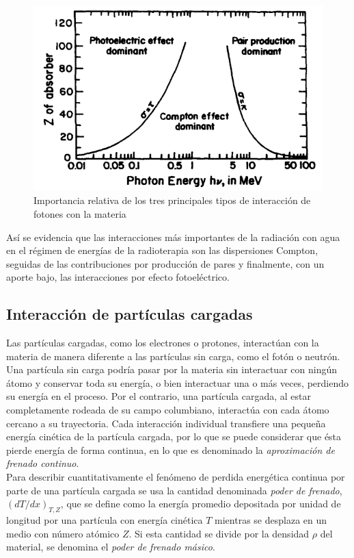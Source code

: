 \begin{figure}[H]
	\centering
	\includegraphics[width=0.7\linewidth]{images/importanciaRelativa.png}
	\caption{Importancia relativa de los tres principales tipos de interacción de fotones con la materia \cite{Attix1986}}
	\label{fig:importanciaRelativa}
\end{figure}

Así se evidencia que las interacciones más importantes de la radiación con agua en el régimen de energías de la radioterapia son las dispersiones Compton, seguidas de las contribuciones por producción de pares y finalmente, con un aporte bajo, las interacciones por efecto fotoeléctrico.  \\

\subsection{Interacción de partículas cargadas}

Las partículas cargadas, como los electrones o protones, interactúan con la materia de manera diferente a las partículas sin carga, como el fotón o neutrón. Una partícula sin carga podría pasar por la materia sin interactuar con ningún átomo y conservar toda su energía, o bien interactuar una o más veces, perdiendo su energía en el proceso. Por el contrario, una partícula cargada, al estar completamente rodeada de su campo columbiano, interactúa con cada átomo cercano a su trayectoria. Cada interacción individual transfiere una pequeña energía cinética de la partícula cargada, por lo que se puede considerar que ésta pierde energía de forma continua, en lo que es denominado la \textit{aproximación de frenado continuo}.\\

Para describir cuantitativamente el fenómeno de perdida energética continua por parte de una partícula cargada se usa la cantidad denominada \textit{poder de frenado}, $(dT/dx)_{T,Z}$, que se define como la energía promedio depositada por unidad de longitud por una partícula con energía cinética $T$ mientras se desplaza en un medio con número atómico $Z$. Si esta cantidad se divide por la densidad $\rho$ del material, se denomina el \textit{poder de frenado másico}.\\

